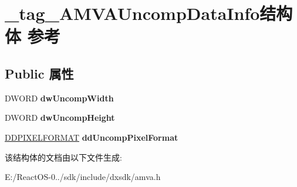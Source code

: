 \hypertarget{struct__tag___a_m_v_a_uncomp_data_info}{}\section{\+\_\+tag\+\_\+\+A\+M\+V\+A\+Uncomp\+Data\+Info结构体 参考}
\label{struct__tag___a_m_v_a_uncomp_data_info}
\subsection*{Public 属性}
\begin{DoxyCompactItemize}
\item 
\mbox{\label{struct__tag___a_m_v_a_uncomp_data_info_a0a29fae5001240f2a8d067296aa724a4}} 
D\+W\+O\+RD {\bfseries dw\+Uncomp\+Width}
\item 
\mbox{\label{struct__tag___a_m_v_a_uncomp_data_info_a1aceb256f25c07afc1639291d8d684bb}} 
D\+W\+O\+RD {\bfseries dw\+Uncomp\+Height}
\item 
\mbox{\label{struct__tag___a_m_v_a_uncomp_data_info_a54ee3f9e24e4208fe64eebb47ed49102}} 
\hyperlink{struct___d_d_p_i_x_e_l_f_o_r_m_a_t}{D\+D\+P\+I\+X\+E\+L\+F\+O\+R\+M\+AT} {\bfseries dd\+Uncomp\+Pixel\+Format}
\end{DoxyCompactItemize}


该结构体的文档由以下文件生成\+:\begin{DoxyCompactItemize}
\item 
E\+:/\+React\+O\+S-\/0../sdk/include/dxsdk/amva.\+h\end{DoxyCompactItemize}
